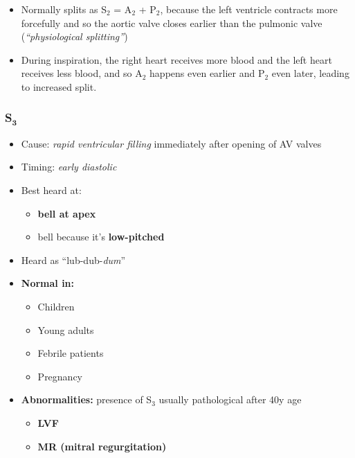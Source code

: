 \documentclass[
  12pt,
]{memoir}
\providecommand{\tightlist}{%
  \setlength{\itemsep}{0pt}\setlength{\parskip}{0pt}}
\begin{document}
\label{sssec:split}

\begin{itemize}
\tightlist
\item
  Normally splits as S\(_2\) = A\(_2\) + P\(_2\), because the left
  ventricle contracts more forcefully and so the aortic valve closes
  earlier than the pulmonic valve (\emph{``physiological splitting''})
\item
  During inspiration, the right heart receives more blood and the left
  heart receives less blood, and so A\(_2\) happens even earlier and
  P\(_2\) even later, leading to increased split.
\end{itemize}

\hypertarget{s_textbf3}{%
\subsubsection{\texorpdfstring{S\(_{\textbf{3}}\)}{S\_\{\textbackslash textbf\{3\}\}}}\label{s_textbf3}}

\begin{itemize}
\tightlist
\item
  Cause: \emph{rapid ventricular filling} immediately after opening of
  AV valves
\item
  Timing: \emph{early diastolic}
\item
  Best heard at:

  \begin{itemize}
  \tightlist
  \item
    \textbf{bell at apex}
  \item
    bell because it's \textbf{low-pitched}
  \end{itemize}
\item
  Heard as ``lub-dub-\emph{dum}''
\item
  \textbf{Normal in:}

  \begin{itemize}
  \tightlist
  \item
    Children
  \item
    Young adults
  \item
    Febrile patients
  \item
    Pregnancy
  \end{itemize}
\item
  \textbf{Abnormalities:} presence of S\(_3\) usually pathological after
  40y age

  \begin{itemize}
  \tightlist
  \item
    \textbf{LVF}
  \item
    \textbf{MR (mitral regurgitation)}
  \end{itemize}
\end{itemize}
\end{document}
